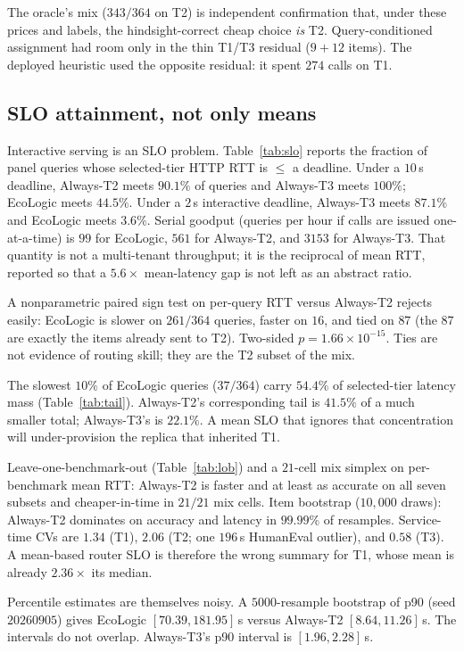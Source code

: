 \documentclass[10pt,conference]{IEEEtran}
\begin{document}
The oracle's mix ($343/364$ on T2) is independent confirmation that, under these prices and labels, the hindsight-correct cheap choice \emph{is} T2. Query-conditioned assignment had room only in the thin T1/T3 residual ($9+12$ items). The deployed heuristic used the opposite residual: it spent $274$ calls on T1.

\subsection{SLO attainment, not only means}
Interactive serving is an SLO problem. Table~\ref{tab:slo} reports the fraction of panel queries whose selected-tier HTTP RTT is $\le$ a deadline. Under a $10$\,s deadline, Always-T2 meets $90.1\%$ of queries and Always-T3 meets $100\%$; EcoLogic meets $44.5\%$. Under a $2$\,s interactive deadline, Always-T3 meets $87.1\%$ and EcoLogic meets $3.6\%$. Serial goodput (queries per hour if calls are issued one-at-a-time) is $99$ for EcoLogic, $561$ for Always-T2, and $3153$ for Always-T3. That quantity is not a multi-tenant throughput; it is the reciprocal of mean RTT, reported so that a $5.6\times$ mean-latency gap is not left as an abstract ratio.

A nonparametric paired sign test on per-query RTT versus Always-T2 rejects easily: EcoLogic is slower on $261/364$ queries, faster on $16$, and tied on $87$ (the $87$ are exactly the items already sent to T2). Two-sided $p=1.66\times 10^{-15}$. Ties are not evidence of routing skill; they are the T2 subset of the mix.

The slowest $10\%$ of EcoLogic queries ($37/364$) carry $54.4\%$ of selected-tier latency mass (Table~\ref{tab:tail}). Always-T2's corresponding tail is $41.5\%$ of a much smaller total; Always-T3's is $22.1\%$. A mean SLO that ignores that concentration will under-provision the replica that inherited T1.

Leave-one-benchmark-out (Table~\ref{tab:lob}) and a $21$-cell mix simplex on per-benchmark mean RTT: Always-T2 is faster and at least as accurate on all seven subsets and cheaper-in-time in $21/21$ mix cells. Item bootstrap ($10{,}000$ draws): Always-T2 dominates on accuracy and latency in $99.99\%$ of resamples. Service-time CVs are $1.34$ (T1), $2.06$ (T2; one $196$\,s HumanEval outlier), and $0.58$ (T3). A mean-based router SLO is therefore the wrong summary for T1, whose mean is already $2.36\times$ its median.

Percentile estimates are themselves noisy. A $5000$-resample bootstrap of p90 (seed $20260905$) gives EcoLogic $[70.39, 181.95]$\,s versus Always-T2 $[8.64, 11.26]$\,s. The intervals do not overlap. Always-T3's p90 interval is $[1.96, 2.28]$\,s.
\end{document}
